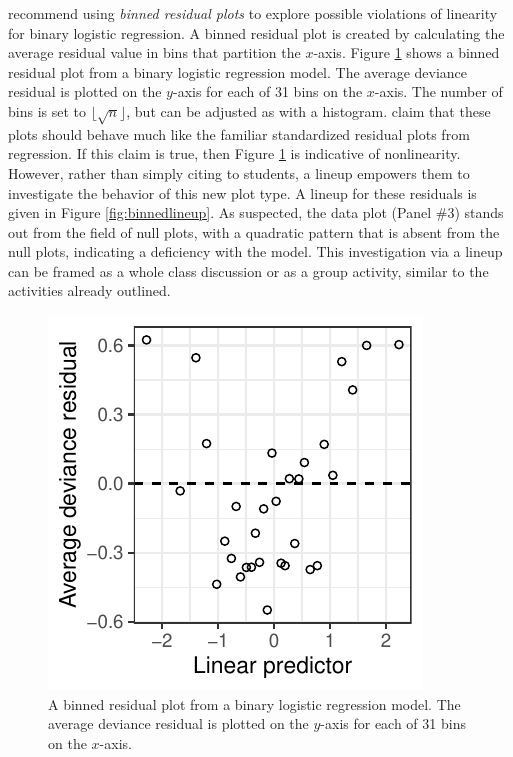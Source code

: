 \documentclass[12pt]{article}
\begin{document}
\citet{GelmanHill:2007} recommend using \emph{binned residual plots} to
explore possible violations of linearity for binary logistic regression.
A binned residual plot is created by calculating the average residual
value in bins that partition the \(x\)-axis. Figure \ref{fig:binned}
shows a binned residual plot from a binary logistic regression model.
The average deviance residual is plotted on the \(y\)-axis for each of
31 bins on the \(x\)-axis. The number of bins is set to
\(\lfloor \sqrt{n} \rfloor\), but can be adjusted as with a histogram.
\citet{GelmanHill:2007} claim that these plots should behave much like
the familiar standardized residual plots from regression. If this claim
is true, then Figure \ref{fig:binned} is indicative of nonlinearity.
However, rather than simply citing \citet{GelmanHill:2007} to students,
a lineup empowers them to investigate the behavior of this new plot
type. A lineup for these residuals is given in Figure
\ref{fig:binnedlineup}. As suspected, the data plot (Panel \#3) stands
out from the field of null plots, with a quadratic pattern that is
absent from the null plots, indicating a deficiency with the model. This
investigation via a lineup can be framed as a whole class discussion or
as a group activity, similar to the activities already outlined.

\begin{figure}
\centering
\includegraphics{figs/binned_resid_plot.pdf}
\caption{\label{fig:binned} A binned residual plot from a binary
logistic regression model. The average deviance residual is plotted on
the \(y\)-axis for each of 31 bins on the \(x\)-axis.}
\end{figure}
\end{document}
